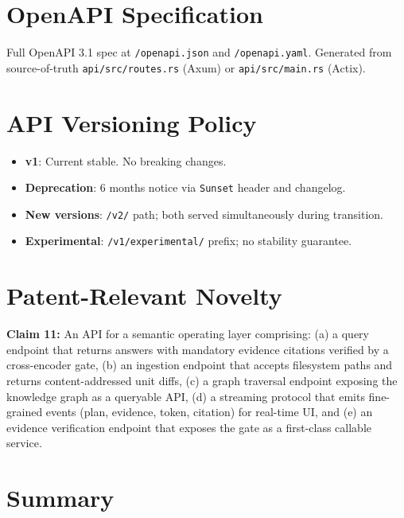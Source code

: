 \section{OpenAPI Specification}
\label{sec:api:openapi}

Full OpenAPI 3.1 spec at \texttt{/openapi.json} and \texttt{/openapi.yaml}.
Generated from source-of-truth \texttt{api/src/routes.rs} (Axum) or \texttt{api/src/main.rs} (Actix).

\section{API Versioning Policy}
\label{sec:api:versioning}

\begin{itemize}
  \item \textbf{v1}: Current stable. No breaking changes.
  \item \textbf{Deprecation}: 6 months notice via \texttt{Sunset} header and changelog.
  \item \textbf{New versions}: \texttt{/v2/} path; both served simultaneously during transition.
  \item \textbf{Experimental}: \texttt{/v1/experimental/} prefix; no stability guarantee.
\end{itemize}

\section{Patent-Relevant Novelty}
\label{sec:api:patent}

\begin{patentclaim}
\textbf{Claim 11:} An API for a semantic operating layer comprising: (a) a query endpoint that returns answers with mandatory evidence citations verified by a cross-encoder gate, (b) an ingestion endpoint that accepts filesystem paths and returns content-addressed unit diffs, (c) a graph traversal endpoint exposing the knowledge graph as a queryable API, (d) a streaming protocol that emits fine-grained events (plan, evidence, token, citation) for real-time UI, and (e) an evidence verification endpoint that exposes the gate as a first-class callable service.
\end{patentclaim}

\section{Summary}
\label{sec:api:summary}

